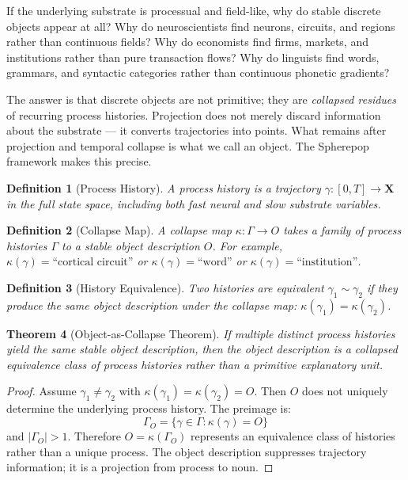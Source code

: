 \documentclass[12pt,a4paper]{article}
\newtheorem{theorem}{Theorem}[section]
\newtheorem{definition}[theorem]{Definition}
\begin{document}
If the underlying substrate is processual and field-like, why do stable discrete objects appear at all? Why do neuroscientists find neurons, circuits, and regions rather than continuous fields? Why do economists find firms, markets, and institutions rather than pure transaction flows? Why do linguists find words, grammars, and syntactic categories rather than continuous phonetic gradients?

The answer is that discrete objects are not primitive; they are \emph{collapsed residues} of recurring process histories. Projection does not merely discard information about the substrate — it converts trajectories into points. What remains after projection and temporal collapse is what we call an object. The Spherepop framework makes this precise.

\begin{definition}[Process History]
A process history is a trajectory $\gamma: [0,T] \to \mathbf{X}$ in the full state space, including both fast neural and slow substrate variables.
\end{definition}

\begin{definition}[Collapse Map]
A collapse map $\kappa: \Gamma \to O$ takes a family of process histories $\Gamma$ to a stable object description $O$. For example, $\kappa(\gamma) = \text{``cortical circuit''}$ or $\kappa(\gamma) = \text{``word''}$ or $\kappa(\gamma) = \text{``institution''}$.
\end{definition}

\begin{definition}[History Equivalence]
Two histories are equivalent $\gamma_1 \sim \gamma_2$ if they produce the same object description under the collapse map: $\kappa(\gamma_1) = \kappa(\gamma_2)$.
\end{definition}

\begin{theorem}[Object-as-Collapse Theorem]
\label{thm:spherepop}
If multiple distinct process histories yield the same stable object description, then the object description is a collapsed equivalence class of process histories rather than a primitive explanatory unit.
\end{theorem}

\begin{proof}
Assume $\gamma_1 \neq \gamma_2$ with $\kappa(\gamma_1) = \kappa(\gamma_2) = O$. Then $O$ does not uniquely determine the underlying process history. The preimage is:
\[
\Gamma_O = \{ \gamma \in \Gamma : \kappa(\gamma) = O \}
\]
and $|\Gamma_O| > 1$. Therefore $O = \kappa(\Gamma_O)$ represents an equivalence class of histories rather than a unique process. The object description suppresses trajectory information; it is a projection from process to noun.
\end{proof}
\end{document}

